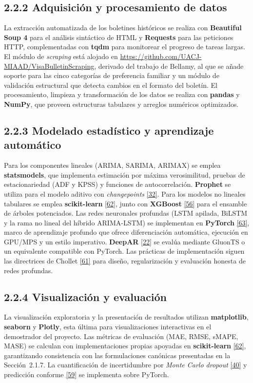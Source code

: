 \documentclass[12pt,letterpaper]{report}
\newcommand{\cita}[1]{\hyperref[bib:#1]{[#1]}}
\begin{document}
\subsection{2.2.2 Adquisición y procesamiento de datos}

La extracción automatizada de los boletines históricos se realiza con \textbf{Beautiful Soup 4} para el análisis sintáctico de HTML y \textbf{Requests} para las peticiones HTTP, complementadas con \textbf{tqdm} para monitorear el progreso de tareas largas. El módulo de \textit{scraping} está alojado en \url{https://github.com/UACJ-MIAAD/VisaBulletinScraping}, derivado del trabajo de Bellamy, al que se añade soporte para las cinco categorías de preferencia familiar y un módulo de validación estructural que detecta cambios en el formato del boletín. El procesamiento, limpieza y transformación de los datos se realiza con \textbf{pandas} y \textbf{NumPy}, que proveen estructuras tabulares y arreglos numéricos optimizados.

\subsection{2.2.3 Modelado estadístico y aprendizaje automático}

Para los componentes lineales (ARIMA, SARIMA, ARIMAX) se emplea \textbf{statsmodels}, que implementa estimación por máxima verosimilitud, pruebas de estacionariedad (ADF y KPSS) y funciones de autocorrelación. \textbf{Prophet} se utiliza para el modelo aditivo con \textit{changepoints} \cita{32}. Para los modelos no lineales tabulares se emplea \textbf{scikit-learn} \cita{62}, junto con \textbf{XGBoost} \cita{56} para el ensamble de árboles potenciados. Las redes neuronales profundas (LSTM apilada, BiLSTM y la rama no lineal del híbrido ARIMA-LSTM) se implementan en \textbf{PyTorch} \cita{63}, marco de aprendizaje profundo que ofrece diferenciación automática, ejecución en GPU/MPS y un estilo imperativo. \textbf{DeepAR} \cita{22} se evalúa mediante GluonTS o un equivalente compatible con PyTorch. Las prácticas de implementación siguen las directrices de Chollet \cita{61} para diseño, regularización y evaluación honesta de redes profundas.

\subsection{2.2.4 Visualización y evaluación}

La visualización exploratoria y la presentación de resultados utilizan \textbf{matplotlib}, \textbf{seaborn} y \textbf{Plotly}, esta última para visualizaciones interactivas en el demostrador del proyecto. Las métricas de evaluación (MAE, RMSE, sMAPE, MASE) se calculan con implementaciones propias apoyadas en \textbf{scikit-learn} \cita{62}, garantizando consistencia con las formulaciones canónicas presentadas en la Sección~2.1.7. La cuantificación de incertidumbre por \textit{Monte Carlo dropout} \cita{40} y predicción conforme \cita{59} se implementa sobre PyTorch.
\end{document}
